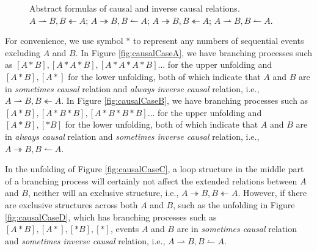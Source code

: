 \documentclass[dvips,...]{llncs}
\begin{document}
\begin{figure}[htbp]
{\begin{minipage}[b]{0.45\textwidth}
	\end{minipage}
	\label{fig:causalCaseC}
}
\caption{Abstract formulas of causal and inverse causal relations.  $A\rightharpoonup B, B\twoheadleftarrow A$;  $A\twoheadrightarrow B, B\leftharpoonup A$;  $A\twoheadrightarrow B, B\twoheadleftarrow A$;  $A\rightharpoonup B, B\leftharpoonup A$.\label{fig:causalCases}}
\end{figure}

For convenience, we use symbol $*$ to represent any numbers of sequential events excluding $A$ and $B$. In Figure \ref{fig:causalCaseA}, we have branching processes such as $[A*B],[A*A*B],[A*A*A*B]...$ for the upper unfolding and $[A*B],[A*]$ for the lower unfolding, both of which indicate that $A$ and $B$ are in \textit{sometimes causal} relation and \textit{always inverse causal} relation, i.e., $A\rightharpoonup B,B\twoheadleftarrow A$. In Figure \ref{fig:causalCaseB}, we have branching processes such as $[A*B],[A*B*B],[A*B*B*B]...$ for the upper unfolding and $[A*B],[*B]$ for the lower unfolding, both of which indicate that $A$ and $B$ are in \textit{always causal} relation and \textit{sometimes inverse causal} relation, i.e., $A\twoheadrightarrow B,B\leftharpoonup A$.

In the unfolding of Figure \ref{fig:causalCaseC}, a loop structure in the middle part of a branching process will certainly not affect the extended relations between $A$ and $B$, neither will an exclusive structure, i.e., $A\twoheadrightarrow B,B\twoheadleftarrow A$. However, if there are exclusive structures across both $A$ and $B$, such as the unfolding in Figure \ref{fig:causalCaseD}, which has branching processes such as $[A*B],[A*],[*B],[*]$, events $A$ and $B$ are in \textit{sometimes causal} relation and \textit{sometimes inverse causal} relation, i.e., $A\rightharpoonup B,B\leftharpoonup A$.
\end{document}
